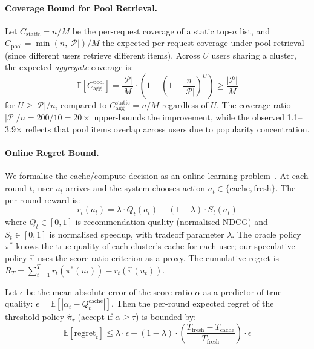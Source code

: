 \documentclass[sigconf,nonacm=false]{acmart}
\begin{document}
\paragraph{Coverage Bound for Pool Retrieval.}
Let $C_{\text{static}} = n/M$ be the per-request coverage of a static top-$n$ list, and $C_{\text{pool}} = \min(n, |\mathcal{P}|)/M$ the expected per-request coverage under pool retrieval (since different users retrieve different items). Across $U$ users sharing a cluster, the expected \emph{aggregate} coverage is:
\begin{equation}
\mathbb{E}[C_{\text{agg}}^{\text{pool}}] = \frac{|\mathcal{P}|}{M} \cdot \left(1 - \left(1 - \frac{n}{|\mathcal{P}|}\right)^U\right) \geq \frac{|\mathcal{P}|}{M}
\label{eq:cov_bound}
\end{equation}
for $U \geq |\mathcal{P}|/n$, compared to $C_{\text{agg}}^{\text{static}} = n/M$ regardless of $U$. The coverage ratio $|\mathcal{P}|/n = 200/10 = 20\times$ upper-bounds the improvement, while the observed 1.1--3.9$\times$ reflects that pool items overlap across users due to popularity concentration.

\paragraph{Online Regret Bound.}
We formalise the cache/compute decision as an online learning problem~\cite{slivkins2019bandits}. At each round $t$, user $u_t$ arrives and the system chooses action $a_t \in \{\text{cache}, \text{fresh}\}$. The per-round reward is:
\begin{equation}
r_t(a_t) = \lambda \cdot Q_t(a_t) + (1 - \lambda) \cdot S_t(a_t)
\end{equation}
where $Q_t \in [0, 1]$ is recommendation quality (normalised NDCG) and $S_t \in [0, 1]$ is normalised speedup, with tradeoff parameter $\lambda$. The oracle policy $\pi^*$ knows the true quality of each cluster's cache for each user; our speculative policy $\hat{\pi}$ uses the score-ratio criterion as a proxy. The cumulative regret is $R_T = \sum_{t=1}^{T} r_t(\pi^*(u_t)) - r_t(\hat{\pi}(u_t))$.

\begin{proposition}
\label{prop:regret}
Let $\epsilon$ be the mean absolute error of the score-ratio $\alpha$ as a predictor of true quality: $\epsilon = \mathbb{E}[|\alpha_t - Q_t^{\text{cache}}|]$. Then the per-round expected regret of the threshold policy $\hat{\pi}_\tau$ (accept if $\alpha \geq \tau$) is bounded by:
\begin{equation}
\mathbb{E}[\text{regret}_t] \leq \lambda \cdot \epsilon + (1-\lambda) \cdot \left(\frac{T_{\text{fresh}} - T_{\text{cache}}}{T_{\text{fresh}}}\right) \cdot \epsilon
\label{eq:regret}
\end{equation}
\end{proposition}
\end{document}
